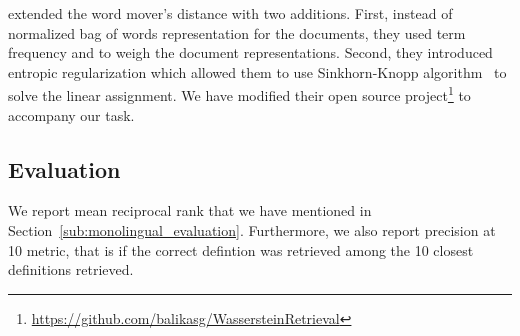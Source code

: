 \textcite{balikas_cross-lingual_2018} extended the word mover's distance with two additions.
First, instead of normalized bag of words representation for the documents, they used term frequency and \tfidf{} to weigh the document representations.
Second, they introduced entropic regularization which allowed them to use Sinkhorn-Knopp algorithm~\cite{sinkhorn_concerning_1967} to solve the linear assignment.
We have modified their open source project\footnote{\url{https://github.com/balikasg/WassersteinRetrieval}} to accompany our task.

\subsection{Evaluation}%
\label{sub:cldr_evaluation}

We report mean reciprocal rank that we have mentioned in Section~\ref{sub:monolingual_evaluation}.
Furthermore, we also report precision at 10 metric, that is if the correct defintion was retrieved among the 10 closest definitions retrieved.
